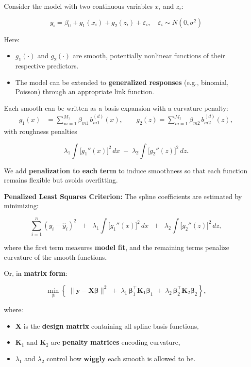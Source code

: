 \documentclass[
  letterpaper,
  DIV=11,
  numbers=noendperiod]{scrreprt}
\providecommand{\tightlist}{%
  \setlength{\itemsep}{0pt}\setlength{\parskip}{0pt}}\usepackage{longtable,booktabs,array}
\begin{document}
Consider the model with two continuous variables \(x_i\) and \(z_i\):

\[
y_i = \beta_0 + g_1(x_i) + g_2(z_i) + \varepsilon_i, 
\quad \varepsilon_i \sim N(0, \sigma^2)
\]

Here:

\begin{itemize}
\tightlist
\item
  \(g_1(\cdot)\) and \(g_2(\cdot)\) are smooth, potentially nonlinear
  functions of their respective predictors.\\
\item
  The model can be extended to \textbf{generalized responses} (e.g.,
  binomial, Poisson) through an appropriate link function.
\end{itemize}

Each smooth can be written as a basis expansion with a curvature
penalty: \[
\begin{aligned}
g_1(x) &= \sum_{m=1}^{M_1} \beta_{m1}\, b_{m1}^{(d)}(x),\qquad
g_2(z)  = \sum_{m=1}^{M_2} \beta_{m2}\, b_{m2}^{(d)}(z),
\end{aligned}
\] with roughness penalties

\[
\lambda_1 \int \big[g_1''(x)\big]^2\,dx \;+\; \lambda_2 \int \big[g_2''(z)\big]^2\,dz.
\]

We add \textbf{penalization to each term} to induce smoothness so that
each function remains flexible but avoids overfitting.

\textbf{Penalized Least Squares Criterion:} The spline coefficients are
estimated by minimizing:

\[
\sum_{i=1}^n (y_i - \hat{y}_i)^2
\;\;+\;\;
\lambda_1 \int \big[g_1''(x)\big]^2\,dx
\;\;+\;\;
\lambda_2 \int \big[g_2''(z)\big]^2\,dz,
\]

where the first term measures \textbf{model fit}, and the remaining
terms penalize curvature of the smooth functions.

Or, in \textbf{matrix form}:

\[
\min_{\boldsymbol{\beta}}
\left\{
\;\|\mathbf{y} - \mathbf{X}\boldsymbol{\beta}\|^2
\;+\;
\lambda_1\, \boldsymbol{\beta}_1^\top \mathbf{K}_1 \boldsymbol{\beta}_1
\;+\;
\lambda_2\, \boldsymbol{\beta}_2^\top \mathbf{K}_2 \boldsymbol{\beta}_2
\right\},
\]

where:

\begin{itemize}
\tightlist
\item
  \(\mathbf{X}\) is the \textbf{design matrix} containing all spline
  basis functions,
\item
  \(\mathbf{K}_1\) and \(\mathbf{K}_2\) are \textbf{penalty matrices}
  encoding curvature,
\item
  \(\lambda_1\) and \(\lambda_2\) control how \textbf{wiggly} each
  smooth is allowed to be.
\end{itemize}
\end{document}
